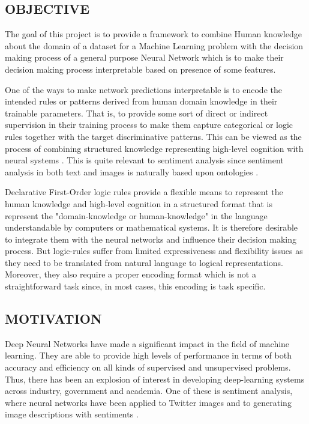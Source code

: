 \documentclass[12pt,a4paper]{article}
\begin{document}
\subsection{OBJECTIVE}
The goal of this project is to provide a framework to combine Human knowledge about the domain of a dataset for a Machine Learning problem with the decision making process of a general purpose Neural Network which is to make their decision making process interpretable based on presence of some features.
\vspace{2mm}

One of the ways to make network predictions interpretable is to encode the intended rules or patterns derived from human domain knowledge in their trainable parameters. That is, to provide some sort of direct or indirect supervision in their training process to make them capture categorical or logic rules together with the target discriminative patterns. This can be viewed as the process of combining structured knowledge representing high-level cognition with neural systems \cite{Garcez:2002}. This is quite relevant to sentiment analysis since sentiment analysis in both text and images is naturally based upon ontologies  \cite{Borth:2014}. 
\vspace{2mm}

Declarative First-Order logic rules provide a flexible means to represent the human knowledge and high-level cognition in a structured format that is represent the "domain-knowledge or human-knowledge" in the language understandable by computers or mathematical systems. It is therefore desirable to integrate them with the neural networks and influence their decision making process. But logic-rules suffer from limited expressiveness and flexibility issues as they need to be translated from natural language to logical representations. Moreover, they also require a proper encoding format which is not a straightforward task since, in most cases, this encoding is task specific.
\vspace{2 mm}

\subsection{MOTIVATION}
Deep Neural Networks have made a significant impact in the field of machine learning. They are able to provide high levels of performance in terms of both accuracy and efficiency on all kinds of supervised and unsupervised problems. Thus, there has been an explosion of interest in developing deep-learning  systems across industry, government and academia. One of these is sentiment analysis, where neural networks have been applied to Twitter images \cite{You:2015,Vadicamo:2017} and to generating image descriptions with sentiments \cite{Mathews:2016}.
\vspace{2mm}
\end{document}
